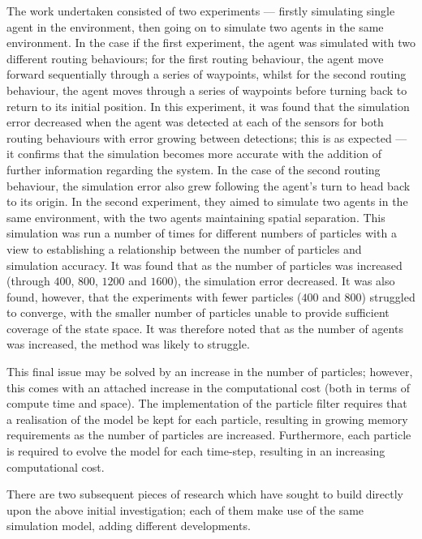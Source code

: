 The work undertaken consisted of two experiments --- firstly simulating single
agent in the environment, then going on to simulate two agents in the same
environment.
In the case if the first experiment, the agent was simulated with two different
routing behaviours; for the first routing behaviour, the agent move forward
sequentially through a series of waypoints, whilst for the second routing
behaviour, the agent moves through a series of waypoints before turning back to
return to its initial position.
In this experiment, it was found that the simulation error decreased when the
agent was detected at each of the sensors for both routing behaviours with error
growing between detections; this is as expected --- it confirms that the
simulation becomes more accurate with the addition of further information
regarding the system.
In the case of the second routing behaviour, the simulation error also grew
following the agent's turn to head back to its origin.
In the second experiment, they aimed to simulate two agents in the same
environment, with the two agents maintaining spatial separation.
This simulation was run a number of times for different numbers of particles
with a view to establishing a relationship between the number of particles and
simulation accuracy.
It was found that as the number of particles was increased (through $400$,
$800$, $1200$ and $1600$), the simulation error decreased.
It was also found, however, that the experiments with fewer particles ($400$ and
$800$) struggled to converge, with the smaller number of particles unable to
provide sufficient coverage of the state space.
It was therefore noted that as the number of agents was increased, the method
was likely to struggle.

This final issue may be solved by an increase in the number of particles;
however, this comes with an attached increase  in the computational cost (both
in terms of compute time and space).
The implementation of the particle filter requires that a realisation of the
model be kept for each particle, resulting in growing memory requirements as
the number of particles are increased.
Furthermore, each particle is required to evolve the model for each time-step,
resulting in an increasing computational cost.

There are two subsequent pieces of research which have sought to build directly
upon the above initial investigation; each of them make use of the same
simulation model, adding different developments.

